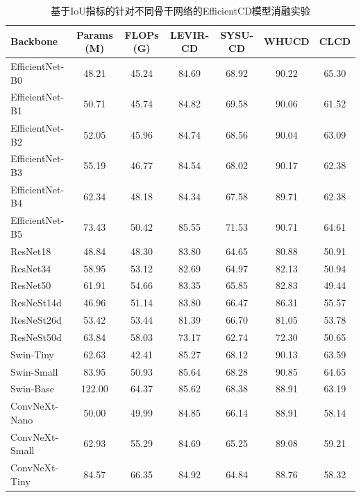 \begin{table}[!htb]
  \centering
  \setlength{\tabcolsep}{3pt}
  \caption{基于IoU指标的针对不同骨干网络的EfficientCD模型消融实验}
  \label{tab:efficientcd_backbone}
  \begin{tabular}{lcccccc}
    \toprule
    Backbone         & Params (M) & FLOPs (G) & LEVIR-CD & SYSU-CD & WHUCD & CLCD   \\
    \midrule
    EfficientNet-B0  &   48.21    &   45.24   &  84.69   &  68.92  & 90.22 & 65.30  \\
    EfficientNet-B1  &   50.71    &   45.74   &  84.82   &  69.58  & 90.06 & 61.52  \\
    EfficientNet-B2  &   52.05    &   45.96   &  84.74   &  68.56  & 90.04 & 63.09  \\
    EfficientNet-B3  &   55.19    &   46.77   &  84.54   &  68.02  & 90.17 & 62.38  \\
    EfficientNet-B4  &   62.34    &   48.18   &  84.34   &  67.58  & 89.71 & 62.38  \\
    EfficientNet-B5  &   73.43    &   50.42   &  85.55   &  71.53  & 90.71 & 64.61  \\
    ResNet18         &   48.84    &   48.30   &  83.80   &  64.65  & 80.88 & 50.91  \\
    ResNet34         &   58.95    &   53.12   &  82.69   &  64.97  & 82.13 & 50.94  \\
    ResNet50         &   61.91    &   54.66   &  83.35   &  65.85  & 82.83 & 49.44  \\
    ResNeSt14d       &   46.96    &   51.14   &  83.80   &  66.47  & 86.31 & 55.57  \\
    ResNeSt26d       &   53.42    &   53.44   &  81.39   &  66.70  & 81.05 & 53.78  \\
    ResNeSt50d       &   63.84    &   58.03   &  73.17   &  62.74  & 72.30 & 50.65  \\
    Swin-Tiny        &   62.63    &   42.41   &  85.27   &  68.12  & 90.13 & 63.59  \\
    Swin-Small       &   83.95    &   50.93   &  85.64   &  68.28  & 90.85 & 64.65  \\
    Swin-Base        &  122.00    &   64.37   &  85.62   &  68.38  & 88.91 & 63.19  \\
    ConvNeXt-Nano    &   50.00    &   49.99   &  84.85   &  66.14  & 88.91 & 58.14  \\
    ConvNeXt-Small   &   62.93    &   55.29   &  84.69   &  65.25  & 89.08 & 59.21  \\
    ConvNeXt-Tiny    &   84.57    &   66.35   &  84.92   &  64.84  & 88.76 & 58.32  \\
    \bottomrule
  \end{tabular}
\end{table}



